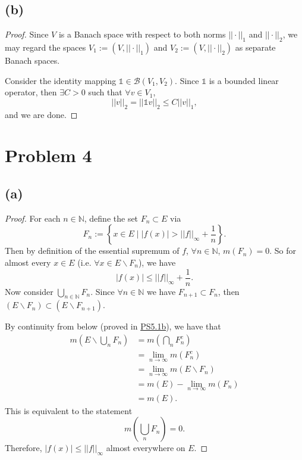 \documentclass{article}
\newcommand{\N}{\mathbb{N}} %
\begin{document}
\subsection*{(b)}
\begin{proof}
	Since $V$ is a Banach space with respect to both norms $||\cdot||_1$ and $||\cdot||_2$, we may regard the spaces $V_1 := (V, ||\cdot||_1)$ and $V_2 := (V, ||\cdot||_2)$ as separate Banach spaces.
	
	Consider the identity mapping $\mathds{1} \in \mathcal{B}(V_1, V_2)$. Since $\mathds{1}$ is a bounded linear operator, then $\exists C > 0$ such that $\forall v \in V_1$,
	\begin{equation}
		||v||_2 = ||\mathds{1} v||_2 \leq C ||v||_1,
	\end{equation}
	and we are done.
\end{proof}
\section*{Problem 4}
\subsection*{(a)}
\begin{proof}
	For each $n \in \N$, define the set $F_n \subset E$ via 
	\begin{equation}
		F_n := \left\{x \in E \;|\; |f(x)| > ||f||_{\infty} + \frac{1}{n}\right\}.
	\end{equation}
	Then by definition of the essential supremum of $f$, $\forall n \in \N$, $m(F_n) = 0$. So for almost every $x \in E$ (i.e. $\forall x \in E \backslash F_n$), we have
	\begin{equation}
		|f(x)| \leq ||f||_{\infty} + \frac{1}{n}.
	\end{equation}
	Now consider $\bigcup_{n \in \N}F_n$. Since $\forall n \in \N$ we have $F_{n+1} \subset F_n$, then \\$(E \backslash F_n) \subset (E \backslash F_{n+1})$.
	
	By continuity from below (proved in \href{https://github.com/ovega14/FunctionalAnalysis_solutions/blob/main/PS5/18.102_ps5.pdf}{PS5.1b}), we have that
	\begin{align}
		m\left(E \backslash \bigcup_n F_n\right) &= m\left(\bigcap_n F_n^c\right) \\
		&= \lim_{n \to \infty} m(F_n^c) \\
		&= \lim_{n \to \infty} m(E \backslash F_n) \\
		&= m(E) - \lim_{n \to \infty}m(F_n) \\
		&= m(E).
	\end{align}
	This is equivalent to the statement
	\begin{equation}
		m\left(\bigcup_n F_n\right) = 0.
	\end{equation}
	Therefore, $|f(x)| \leq ||f||_{\infty}$ almost everywhere on $E$.
\end{proof}
\end{document}
